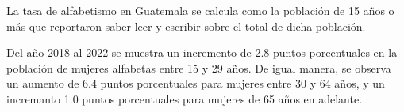 La tasa de alfabetismo en Guatemala se calcula como la población de 15 años o más que reportaron saber leer y escribir sobre el total de dicha población.

Del año 2018 al 2022 se muestra un incremento de 2.8 puntos porcentuales en la población de mujeres alfabetas entre 15 y 29 años. De igual manera, se observa un aumento de 6.4 puntos porcentuales para mujeres entre 30 y 64 años, y un incremanto 1.0 puntos porcentuales para mujeres de 65 años en adelante. 